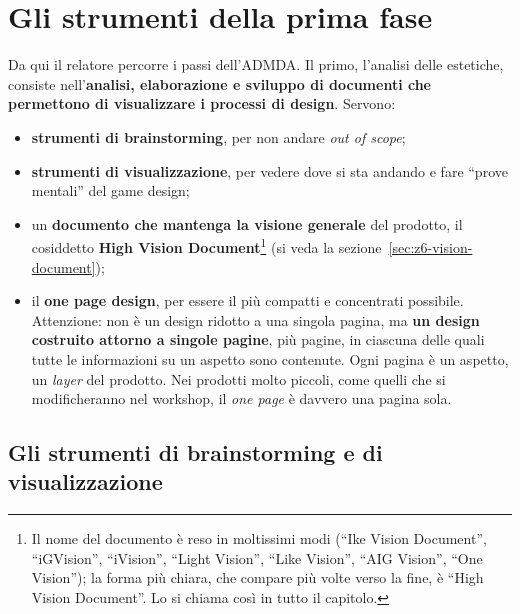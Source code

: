 \section{Gli strumenti della prima fase}
\label{sec:z6-strumenti}

Da qui il relatore percorre i passi dell'ADMDA. Il primo, l'analisi delle
estetiche, consiste nell'\textbf{analisi, elaborazione e sviluppo di documenti
che permettono di visualizzare i processi di design}. Servono:
\begin{itemize}
  \item \textbf{strumenti di brainstorming}, per non andare \emph{out of scope};
  \item \textbf{strumenti di visualizzazione}, per vedere dove si sta andando e
        fare ``prove mentali'' del game design;
  \item un \textbf{documento che mantenga la visione generale} del prodotto, il
        cosiddetto \textbf{High Vision Document}\footnote{Il nome del documento
        è reso in moltissimi modi (``Ike Vision Document'', ``iGVision'',
        ``iVision'', ``Light Vision'', ``Like Vision'', ``AIG Vision'', ``One
        Vision''); la forma più chiara, che compare più volte verso la fine, è
        ``High Vision Document''. Lo si chiama così in tutto il capitolo.} (si
        veda la sezione~\ref{sec:z6-vision-document});
  \item il \textbf{one page design}, per essere il più compatti e concentrati
        possibile. Attenzione: non è un design ridotto a una singola pagina, ma
        \textbf{un design costruito attorno a singole pagine}, più pagine, in
        ciascuna delle quali tutte le informazioni su un aspetto sono contenute.
        Ogni pagina è un aspetto, un \emph{layer} del prodotto. Nei prodotti
        molto piccoli, come quelli che si modificheranno nel workshop, il
        \emph{one page} è davvero una pagina sola.
\end{itemize}

\subsection{Gli strumenti di brainstorming e di visualizzazione}
\label{subsec:z6-brainstorming}

